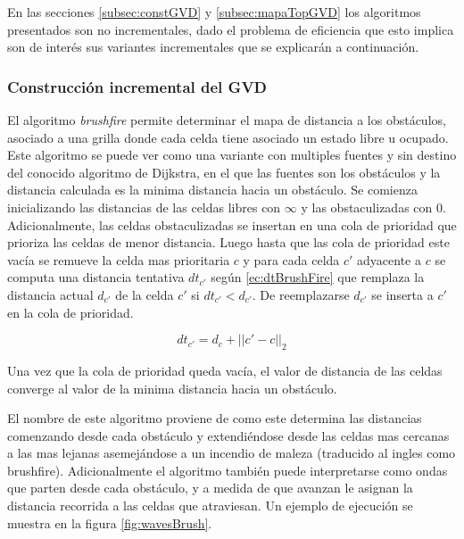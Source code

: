 En las secciones \ref{subsec:constGVD} y \ref{subsec:mapaTopGVD} los algoritmos presentados son no incrementales, dado el problema de eficiencia que esto implica son de interés sus variantes incrementales que se explicarán a continuación.

\subsubsection{Construcción incremental del GVD}

El algoritmo \emph{brushfire} permite determinar el mapa de distancia a los obstáculos, asociado a una grilla donde cada celda tiene asociado un estado libre u ocupado. Este algoritmo se puede ver como una variante con multiples fuentes y sin destino del conocido algoritmo de Dijkstra, en el que las fuentes son los obstáculos y la distancia calculada es la minima distancia hacia un obstáculo. Se comienza inicializando las distancias de las celdas libres con $\infty$ y las obstaculizadas con $0$. Adicionalmente, las celdas obstaculizadas se insertan en una cola de prioridad que prioriza las celdas de menor distancia. Luego hasta que las cola de prioridad este vacía se remueve la celda mas prioritaria $c$ y para cada celda $c'$ adyacente a $c$ se computa una distancia tentativa $dt_{c'}$ según \eqref{ec:dtBrushFire} que remplaza la distancia actual $d_{c'}$ de la celda $c'$ si $dt_{c'}<d_{c'}$. De reemplazarse $d_{c'}$ se inserta a $c'$ en la cola de prioridad. 

\begin{equation}\label{ec:dtBrushFire}
  dt_{c'} = d_c+||c'-c||_2
\end{equation}

Una vez que la cola de prioridad queda vacía, el valor de distancia de las celdas converge al valor de la minima distancia hacia un obstáculo. 

El nombre de este algoritmo proviene de como este determina las distancias comenzando desde cada obstáculo y extendiéndose desde las celdas mas cercanas a las mas lejanas asemejándose a un incendio de maleza (traducido al ingles como brushfire). Adicionalmente el algoritmo también puede interpretarse como ondas que parten desde cada obstáculo, y a medida de que avanzan le asignan la distancia recorrida a las celdas que atraviesan. Un ejemplo de ejecución se muestra en la figura \ref{fig:wavesBrush}.  


